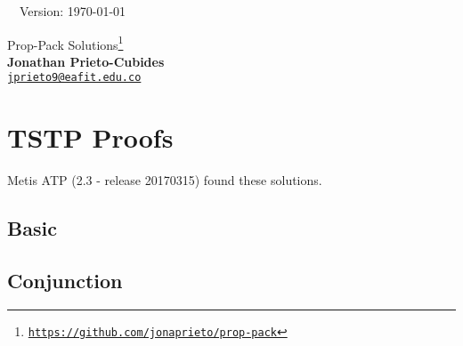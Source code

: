 \documentclass[12pt]{article}
\newcommand{\solutiontstp}[2][c]{}
\begin{document}

\hrulefill\ \ Version: \today\\

\vspace{3mm}
\begin{center}
{\Large Prop-Pack Solutions\footnote{
\href{https://github.com/jonaprieto/prop-pack}{{\color{blue(munsell)}
\texttt{https://github.com/jonaprieto/prop-pack}}}}
}\\
\textbf{Jonathan Prieto-Cubides}\\ %
\href{mailto:jprieto9@eafit.edu.co}{{\color{blue(munsell)}\texttt{jprieto9@eafit.edu.co}}}
\end{center}
\vspace{0.1 cm}

\tableofcontents

\section{TSTP Proofs}
Metis ATP (2.3 - release 20170315) found these solutions.
\subsection{Basic}
\solutiontstp[basic-1.tptp]{problems/basic/basic-1.tstp}
\solutiontstp[basic-2.tptp]{problems/basic/basic-2.tstp}
\solutiontstp[basic-3.tptp]{problems/basic/basic-3.tstp}
\solutiontstp[basic-4.tptp]{problems/basic/basic-4.tstp}

\subsection{Conjunction}
\solutiontstp[conj-1.tptp]{problems/conjunction/conj-1.tstp}
\solutiontstp[conj-2.tptp]{problems/conjunction/conj-2.tstp}
\solutiontstp[conj-3.tptp]{problems/conjunction/conj-3.tstp}
\solutiontstp[conj-4.tptp]{problems/conjunction/conj-4.tstp}
\solutiontstp[conj-5.tptp]{problems/conjunction/conj-5.tstp}
\solutiontstp[conj-6.tptp]{problems/conjunction/conj-6.tstp}
\end{document}
